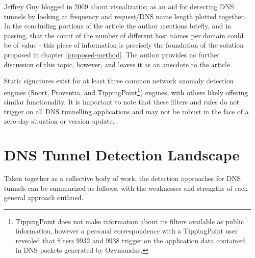 \documentclass[12pt]{report}
\theoremstyle{remark}
\theoremstyle{definition}
\theoremstyle{definition}
\theoremstyle{definition}
\begin{document}
Jeffrey Guy\cite{Guy2009} blogged in 2009 about visualization as an aid for
detecting DNS tunnels by looking at frequency and request/DNS name length
plotted together. In the concluding portions of the article the author mentions
briefly, and in passing, that the count of the number of different host names
per domain could be of value - this piece of information is precisely the
foundation of the solution proposed in chapter \ref{proposed-method}. The author
provides no further discussion of this topic, however, and leaves it as an
anecdote to the article.

Static signatures exist for at least three common network anomaly detection
engines (Snort\cite{Chamberland2009.snort_iodine},
Proventia\cite{Proventia2013.ips_tunnel}, and TippingPoint\footnote{TippingPoint
does not make information about its filters available as public information,
however a personal correspondence with a TippingPoint user revealed that filters
9932 and 9938 trigger on the application data contained in DNS packets generated
by Ozymandns.}) engines, with others likely offering similar functionality. It
is important to note that these filters and rules do not trigger on all DNS
tunnelling applications and may not be robust in the face of a zero-day
situation or version update.

\section{DNS Tunnel Detection Landscape} \label{litreview-summary} Taken
together as a collective body of work, the detection approaches for DNS tunnels
can be summarized as follows, with the weaknesses and strengths of each general
approach outlined.
\end{document}
